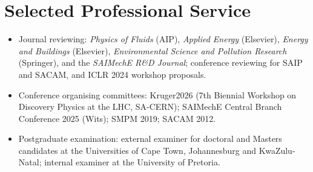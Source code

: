 \documentclass[11pt, a4paper]{article}
\begin{document}
\section{Selected Professional Service}
\begin{itemize}
  \item Journal reviewing: \textit{Physics of Fluids} (AIP), \textit{Applied Energy} (Elsevier), \textit{Energy and Buildings} (Elsevier), \textit{Environmental Science and Pollution Research} (Springer), and the \textit{SAIMechE R\&D Journal}; conference reviewing for SAIP and SACAM, and ICLR 2024 workshop proposals.
  \item Conference organising committees: Kruger2026 (7th Biennial Workshop on Discovery Physics at the LHC, SA-CERN); SAIMechE Central Branch Conference 2025 (Wits); SMPM 2019; SACAM 2012.
  \item Postgraduate examination: external examiner for doctoral and Masters candidates at the Universities of Cape Town, Johannesburg and KwaZulu-Natal; internal examiner at the University of Pretoria.
\end{itemize}
\end{document}
